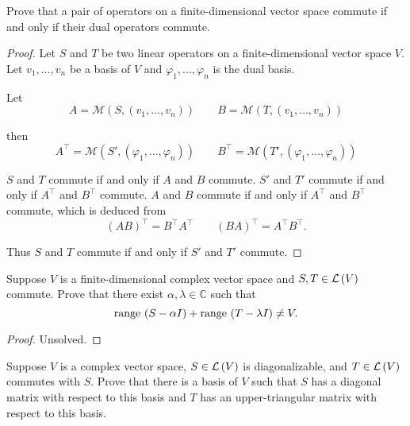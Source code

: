 \begin{exercise}
    Prove that a pair of operators on a finite-dimensional vector space commute if and only if their dual operators commute.
\end{exercise}

\begin{proof}
    Let $S$ and $T$ be two linear operators on a finite-dimensional vector space $V$. Let $v_{1}, \ldots, v_{n}$ be a basis of $V$ and $\varphi_{1}, \ldots, \varphi_{n}$ is the dual basis.

    Let
    \[
        A = \mathcal{M}(S, (v_{1}, \ldots, v_{n}))\qquad
        B = \mathcal{M}(T, (v_{1}, \ldots, v_{n}))
    \]

    then
    \[
        A^{\top} = \mathcal{M}(S', (\varphi_{1}, \ldots, \varphi_{n}))\qquad
        B^{\top} = \mathcal{M}(T', (\varphi_{1}, \ldots, \varphi_{n}))
    \]

    $S$ and $T$ commute if and only if $A$ and $B$ commute. $S'$ and $T'$ commute if and only if $A^{\top}$ and $B^{\top}$ commute. $A$ and $B$ commute if and only if $A^{\top}$ and $B^{\top}$ commute, which is deduced from
    \[
        {(AB)}^{\top} = B^{\top}A^{\top}\qquad {(BA)}^{\top} = A^{\top}B^{\top}.
    \]

    Thus $S$ and $T$ commute if and only if $S'$ and $T'$ commute.
\end{proof}
\newpage

\begin{exercise}
    Suppose $V$ is a finite-dimensional complex vector space and $S, T\in\mathcal{L}\left({V}\right)$ commute. Prove that there exist $\alpha, \lambda\in\mathbb{C}$ such that
    \[
        \operatorname{range}\,{(S - \alpha I)} + \operatorname{range}\,{(T - \lambda I)} \ne V.
    \]
\end{exercise}

\begin{proof}
    Unsolved.
\end{proof}
\newpage

\begin{exercise}
    Suppose $V$ is a complex vector space, $S \in \mathcal{L}\left({V}\right)$ is diagonalizable, and $T\in\mathcal{L}\left({V}\right)$ commutes with $S$. Prove that there is a basis of $V$ such that $S$ has a diagonal matrix with respect to this basis and $T$ has an upper-triangular matrix with respect to this basis.
\end{exercise}

